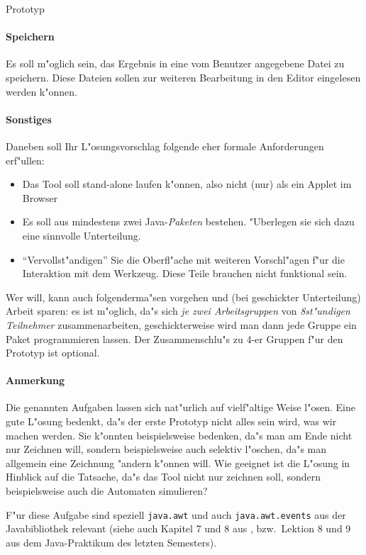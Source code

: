 \documentclass[11pt]{article}
\begin{document}
\begin{namedaufgabe}{Prototyp}
  \paragraph{Speichern}
  Es soll m"oglich sein, das Ergebnis in eine vom Benutzer angegebene Datei
  zu speichern. Diese Dateien sollen zur weiteren Bearbeitung in den Editor
  eingelesen werden k"onnen.
  \paragraph{Sonstiges}
  Daneben soll Ihr L"osungsvorschlag folgende eher formale Anforderungen
  erf"ullen:
  \begin{itemize}
  \item Das Tool soll stand-alone laufen k"onnen, also nicht (nur) als ein
    Applet im Browser
  \item Es soll aus mindestens zwei Java-\emph{Paketen} bestehen.
    "Uberlegen sie sich dazu eine sinnvolle Unterteilung.
  \item "`Vervollst"andigen"' Sie die Oberfl"ache mit weiteren Vorschl"agen
    f"ur die Interaktion mit dem Werkzeug. Diese Teile brauchen nicht
    funktional sein. 
  \end{itemize}
  Wer will, kann auch folgenderma"sen vorgehen und (bei geschickter
  Unterteilung) Arbeit sparen: es ist m"oglich, da"s sich \emph{je zwei
    Arbeitsgruppen} von \emph{8st"undigen Teilnehmer} zusammenarbeiten,
  geschickterweise wird man dann jede Gruppe ein Paket programmieren
  lassen. Der Zusammenschlu"s zu 4-er Gruppen f"ur den Prototyp ist
  optional.
  
  \paragraph{Anmerkung} 
  Die genannten Aufgaben lassen sich nat"urlich auf vielf"altige Weise
  l"osen.  Eine gute L"osung bedenkt, da"s der erste Prototyp nicht alles
  sein wird, was wir machen werden. Sie k"onnten beispielsweise bedenken,
  da"s man am Ende nicht nur Zeichnen will, sondern beispielsweise auch
  selektiv l"oschen, da"s man allgemein eine Zeichnung "andern k"onnen
  will. Wie geeignet ist die L"osung in Hinblick auf die Tatsache, da"s das
  Tool nicht nur zeichnen soll, sondern beispielsweise auch die Automaten
  simulieren?
  
  F"ur diese Aufgabe sind speziell \texttt{java.awt} und auch
  \texttt{java.awt.events} aus der Javabibliothek relevant (siehe auch
  Kapitel 7 und 8 aus \cite{flanagan:javanutshell}, bzw.~Lektion 8 und 9
  aus dem Java-Praktikum des letzten Semesters).


\end{namedaufgabe}
\end{document}
